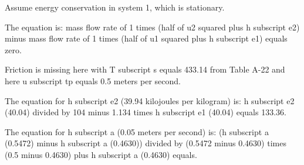 Assume energy conservation in system 1, which is stationary.

The equation is:
mass flow rate of 1 times (half of u2 squared plus h subscript e2) minus mass flow rate of 1 times (half of u1 squared plus h subscript e1) equals zero.

Friction is missing here with T subscript s equals 433.14 from Table A-22 and here u subscript tp equals 0.5 meters per second.

The equation for h subscript e2 (39.94 kilojoules per kilogram) is:
h subscript e2 (40.04) divided by 104 minus 1.134 times h subscript e1 (40.04) equals 133.36.

The equation for h subscript a (0.05 meters per second) is:
(h subscript a (0.5472) minus h subscript a (0.4630)) divided by (0.5472 minus 0.4630) times (0.5 minus 0.4630) plus h subscript a (0.4630) equals.